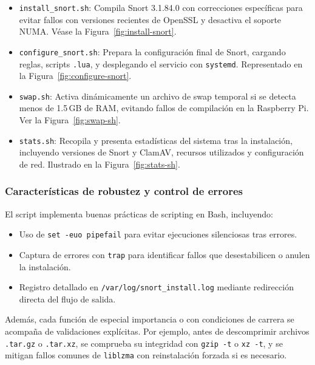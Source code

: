 \documentclass[11pt,a4paper,twoside]{report}
\begin{document}
\begin{itemize}
	\item \texttt{install\_snort.sh}: Compila Snort 3.1.84.0 con correcciones específicas para evitar fallos con versiones recientes de OpenSSL y desactiva el soporte NUMA.  
	Véase la Figura~\ref{fig:install-snort}.
	
	\item \texttt{configure\_snort.sh}: Prepara la configuración final de Snort, cargando reglas, scripts \texttt{.lua}, y desplegando el servicio con \texttt{systemd}.  
	Representado en la Figura~\ref{fig:configure-snort}.
	
	\item \texttt{swap.sh}: Activa dinámicamente un archivo de swap temporal si se detecta menos de 1.5\,GB de RAM, evitando fallos de compilación en la Raspberry Pi.  
	Ver la Figura~\ref{fig:swap-sh}.
	
	\item \texttt{stats.sh}: Recopila y presenta estadísticas del sistema tras la instalación, incluyendo versiones de Snort y ClamAV, recursos utilizados y configuración de red.  
	Ilustrado en la Figura~\ref{fig:stats-sh}.
\end{itemize}

\subsubsection{Características de robustez y control de errores}

El script implementa buenas prácticas de scripting en Bash, incluyendo:

\begin{itemize}
	\item Uso de \texttt{set -euo pipefail} para evitar ejecuciones silenciosas tras errores.
	\item Captura de errores con \texttt{trap} para identificar fallos que desestabilicen o anulen la instalación.
	\item Registro detallado en \texttt{/var/log/snort\_install.log} mediante redirección directa del flujo de salida.
\end{itemize}

Además, cada función de especial importancia o con condiciones de carrera se acompaña de validaciones explícitas. Por ejemplo, antes de descomprimir archivos \texttt{.tar.gz} o \texttt{.tar.xz}, se comprueba su integridad con \texttt{gzip -t} o \texttt{xz -t}, y se mitigan fallos comunes de \texttt{liblzma} con reinstalación forzada si es necesario.
\end{document}
